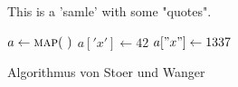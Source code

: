 \documentclass{article}
\begin{document}
\begin{preview}
    This is a 'samle' with some "quotes".

    \begin{algorithm}[H]
        \begin{algorithmic}
            \State $a \gets \Call{map}{~}$
            \State $a['x'] \gets 42$
            \State $a["x"] \gets 1337$
        \end{algorithmic}
    \caption{Algorithmus von Stoer und Wanger}
    \label{alg:seq1}
    \end{algorithm}
\end{preview}
\end{document}
